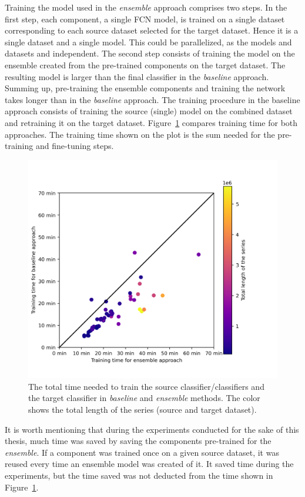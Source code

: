 \documentclass[a4paper,11pt,twoside]{report}
\theoremstyle{definition}
\begin{document}
Training the model used in the \textit{ensemble} approach comprises two steps. In the first step, each component, a single FCN model, is trained on a single dataset corresponding to each source dataset selected for the target dataset. Hence it is a single dataset and a single model. This could be parallelized, as the models and datasets and independent. The second step consists of training the model on the ensemble created from the pre-trained components on the target dataset. The resulting model is larger than the final classifier in the \textit{baseline} approach. Summing up, pre-training the ensemble components and training the network takes longer than in the \textit{baseline} approach. The training procedure in the baseline approach consists of training the source (single) model on the combined dataset and retraining it on the target dataset.
Figure~\ref{fig:baseline_ensemble_traning_time} compares training time for both approaches. The training time shown on the plot is the sum needed for the pre-training and fine-tuning steps.
\FloatBarrier
\begin{figure}[h!t]
\centering
\includegraphics[width=15cm]{imgs/baseline_vs_ensemble/times_comparison.png}
\caption{The total time needed to train the source classifier/classifiers and the target classifier in \textit{baseline} and \textit{ensemble} methods. The color shows the total length of the series (source and target dataset).}
\label{fig:baseline_ensemble_traning_time}
\end{figure}
\FloatBarrier
It is worth mentioning that during the experiments conducted for the sake of this thesis, much time was saved by saving the components pre-trained for the \textit{ensemble}. If a component was trained once on a given source dataset, it was reused every time an ensemble model was created of it. It saved time during the experiments, but the time saved was not deducted from the time shown in Figure~\ref{fig:baseline_ensemble_traning_time}.
\end{document}

